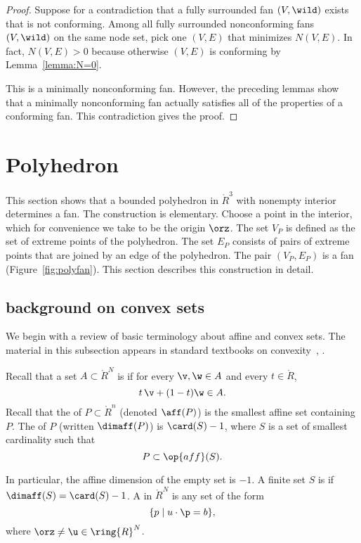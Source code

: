 \begin{proof}
Suppose for a contradiction that a fully surrounded fan $(V,\wild )$
exists that is not conforming.  Among all fully surrounded
nonconforming fans $(V,\wild )$ on the same node set, pick one $(V,E)$
that minimizes $N(V,E)$.  In fact, $N(V,E)>0$ because otherwise $(V,E)$
is conforming by Lemma~\ref{lemma:N=0}.

This is a minimally nonconforming fan.  However, the preceding lemmas show
that a minimally nonconforming fan actually satisfies all of the properties
of a conforming fan.   This contradiction gives the proof.
\end{proof}



\section{Polyhedron}\label{sec:poly}

This section shows that a bounded polyhedron in $\ring{R}^3$ with
nonempty interior determines a fan.  The construction is elementary.
Choose a point in the interior, which for convenience we take to be
the origin $\orz$.  The set $V_P$ is defined as the set of extreme
points of the polyhedron.  The set $E_P$ consists of pairs of extreme
points that are joined by an edge of the polyhedron.  The pair
$(V_P,E_P)$ is a fan (Figure~\ref{fig:polyfan}).  This section describes this construction in
 detail.



\subsection{background on convex sets}

We begin with a review of basic terminology about affine and convex
sets.  The material in this subsection appears in standard textbooks
on convexity~\cite{barvinok:2002}, \cite{webster:1994}.

\begin{definition}\label{def:affine} 
Recall that a set $A\subset\ring{R}^N$ is  if for
every $\v,\w\in A$ and every $t \in \ring{R}$, 
\[ 
  t\, \v + (1-t) \w \in A.
\] 
Recall that
the  of $P\subset\ring{R}^n$ (denoted $\aff(P)$) 
is the smallest affine set
containing $P$.  The  of $P$ (written $\dimaff(P)$) is
$\card(S)-1$, where $S$ is a set of smallest cardinality such that
\[ 
P \subset \op{aff}(S).
\] 
\end{definition}
In particular, the affine dimension of the empty set is $-1$.
A finite set $S$ is 
 if $\dimaff(S) = \card(S)-1$.
A  in $\ring{R}^N$ is any set of the form
\[ 
\{p\mid u\cdot \p = b\},
\] 
where $\orz\ne\u\in\ring{R}^N$.
%
%



